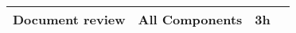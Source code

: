 \begin{table}[H]
\begin{tabular}{|l|l|l|l|}
Document review & All Components  & 3h                                                                                                                                                                                                                                                                                                                                                                                                                                                                                                                                              \\ \hline
\end{tabular}
\end{table}